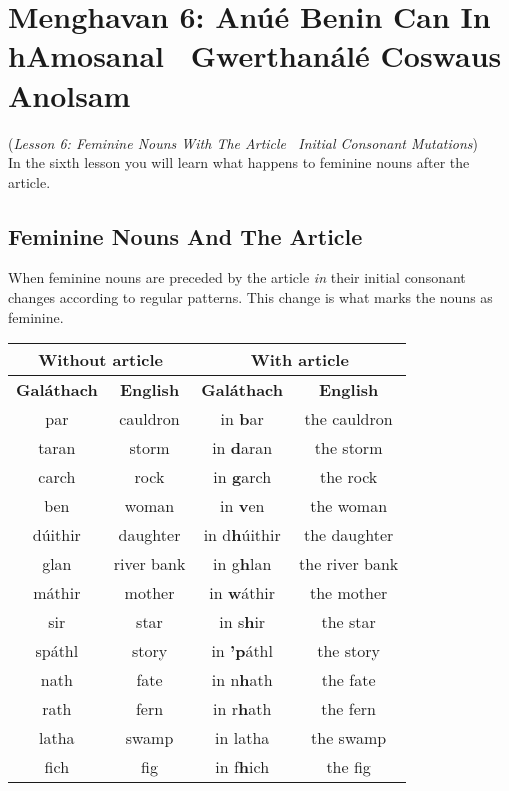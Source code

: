 \section{Menghavan 6: An\'{u}\'{e} Benin Can In hAmosanal \textendash\ Gwerthan\'{a}l\'{e} Coswaus Anolsam}
(\textit{Lesson 6: Feminine Nouns With The Article \textendash\ Initial Consonant Mutations})\\
In the sixth lesson you will learn what happens to feminine nouns after the article.

\subsection{Feminine Nouns And The Article}

When feminine nouns are preceded by the article \textit{in} their initial consonant changes according to regular patterns. This change is what marks the nouns as feminine.
\begin{table}[H]
\centering
\begin{tabular}{c|c|c|c}
  \multicolumn{2}{c|}{\textbf{Without article}} & \multicolumn{2}{c}{\textbf{With article}}\\
  \toprule
  \textbf{Gal\'{a}thach} & \textbf{English} & \textbf{Gal\'{a}thach} & \textbf{English}\\
  \toprule
  par & cauldron & in \textbf{b}ar & the cauldron\\
  taran & storm & in \textbf{d}aran & the storm\\
  carch & rock & in \textbf{g}arch & the rock\\
  ben & woman & in \textbf{v}en & the woman\\
  d\'{u}ithir & daughter & in d\textbf{h}\'{u}ithir & the daughter\\
  glan & river bank & in g\textbf{h}lan & the river bank\\
  m\'{a}thir & mother & in \textbf{w}\'{a}thir & the mother\\
  sir & star & in s\textbf{h}ir & the star\\
  sp\'{a}thl & story & in \textbf{'p}\'{a}thl & the story\\
  nath & fate & in n\textbf{h}ath & the fate\\
  rath & fern & in r\textbf{h}ath & the fern\\
  latha & swamp & in latha & the swamp\\
  fich & fig & in f\textbf{h}ich & the fig
\end{tabular}
\label{examples_article_feminine_nouns}
\end{table}

